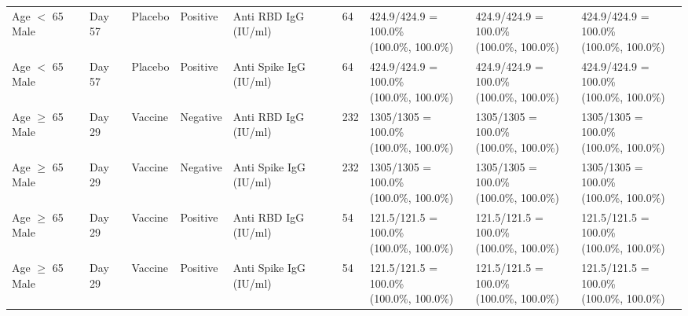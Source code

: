 \documentclass[]{book}
\theoremstyle{definition}
\theoremstyle{definition}
\theoremstyle{definition}
\newcommand{\1}{\mathbbm{1}}
\begin{document}
\begin{landscape}
\begin{ThreePartTable}
\begin{longtable}[t]{>{\raggedright\arraybackslash}p{2.7cm}llllllll}
\hspace{1em}Age $<$ 65 Male & Day 57 & Placebo & Positive & Anti RBD IgG (IU/ml) & 64 & \makecell[l]{424.9/424.9 = 100.0\%\\(100.0\%, 100.0\%)} & \makecell[l]{424.9/424.9 = 100.0\%\\(100.0\%, 100.0\%)} & \makecell[l]{424.9/424.9 = 100.0\%\\(100.0\%, 100.0\%)}\\
\hspace{1em}Age $<$ 65 Male & Day 57 & Placebo & Positive & Anti Spike IgG (IU/ml) & 64 & \makecell[l]{424.9/424.9 = 100.0\%\\(100.0\%, 100.0\%)} & \makecell[l]{424.9/424.9 = 100.0\%\\(100.0\%, 100.0\%)} & \makecell[l]{424.9/424.9 = 100.0\%\\(100.0\%, 100.0\%)}\\
\hspace{1em}Age $\geq$ 65 Male & Day 29 & Vaccine & Negative & Anti RBD IgG (IU/ml) & 232 & \makecell[l]{1305/1305 = 100.0\%\\(100.0\%, 100.0\%)} & \makecell[l]{1305/1305 = 100.0\%\\(100.0\%, 100.0\%)} & \makecell[l]{1305/1305 = 100.0\%\\(100.0\%, 100.0\%)}\\
\hspace{1em}Age $\geq$ 65 Male & Day 29 & Vaccine & Negative & Anti Spike IgG (IU/ml) & 232 & \makecell[l]{1305/1305 = 100.0\%\\(100.0\%, 100.0\%)} & \makecell[l]{1305/1305 = 100.0\%\\(100.0\%, 100.0\%)} & \makecell[l]{1305/1305 = 100.0\%\\(100.0\%, 100.0\%)}\\
\hspace{1em}Age $\geq$ 65 Male & Day 29 & Vaccine & Positive & Anti RBD IgG (IU/ml) & 54 & \makecell[l]{121.5/121.5 = 100.0\%\\(100.0\%, 100.0\%)} & \makecell[l]{121.5/121.5 = 100.0\%\\(100.0\%, 100.0\%)} & \makecell[l]{121.5/121.5 = 100.0\%\\(100.0\%, 100.0\%)}\\
\hspace{1em}Age $\geq$ 65 Male & Day 29 & Vaccine & Positive & Anti Spike IgG (IU/ml) & 54 & \makecell[l]{121.5/121.5 = 100.0\%\\(100.0\%, 100.0\%)} & \makecell[l]{121.5/121.5 = 100.0\%\\(100.0\%, 100.0\%)} & \makecell[l]{121.5/121.5 = 100.0\%\\(100.0\%, 100.0\%)}\\

\end{longtable}
\end{ThreePartTable}
\end{landscape}
\end{document}
